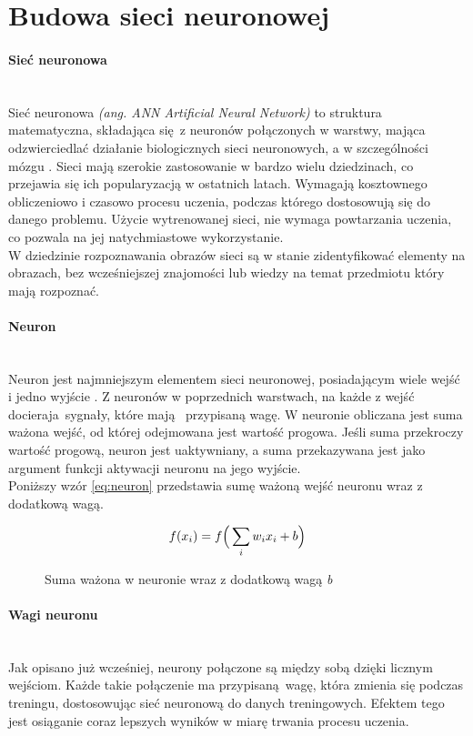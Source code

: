 \section{Budowa sieci neuronowej}
\paragraph{Sieć neuronowa} \mbox{}\\
Sieć neuronowa \textit{(ang. ANN Artificial Neural Network)} to struktura matematyczna,
składająca się z neuronów połączonych w warstwy, mająca odzwierciedlać działanie
biologicznych sieci neuronowych, a w szczególności mózgu \cite{intuitiveExplanation, WIKIcnn}.
Sieci mają szerokie zastosowanie w bardzo wielu dziedzinach, co przejawia się ich
popularyzacją w ostatnich latach. Wymagają kosztownego obliczeniowo i czasowo
procesu uczenia, podczas którego dostosowują się do danego problemu. Użycie wytrenowanej
sieci, nie wymaga powtarzania uczenia, co pozwala na jej natychmiastowe wykorzystanie.\\
W dziedzinie rozpoznawania obrazów sieci są w stanie zidentyfikować elementy na obrazach,
bez wcześniejszej znajomości lub wiedzy na temat przedmiotu który mają rozpoznać.

\paragraph{Neuron} \mbox{}\\
Neuron jest najmniejszym elementem sieci neuronowej, posiadającym wiele wejść i jedno wyjście \cite{CS231n_activ, NNbiology, NeuronAnimation}.
Z neuronów w poprzednich warstwach, na każde z wejść docieraja sygnały, które mają 
przypisaną wagę. W neuronie obliczana jest suma ważona wejść, od której odejmowana jest
wartość progowa. Jeśli suma przekroczy wartość progową, neuron jest uaktywniany, a suma
przekazywana jest jako argument funkcji aktywacji neuronu na jego wyjście.\\
Poniższy wzór \ref{eq:neuron} przedstawia sumę ważoną wejść neuronu wraz z dodatkową wagą.
\begin{figure}[h!]
\renewcommand{\figurename}{Wzór}%
\begin{equation} \label{eq:neuron}
f(x_{i}) = f\Big(\sum_{i}w_{i}x_{i} + b \Big)\\
\end{equation}
\caption{Suma ważona w neuronie wraz z dodatkową wagą \textit{b}}
\end{figure}

\paragraph{Wagi neuronu} \mbox{}\\
Jak opisano już wcześniej, neurony połączone są między sobą dzięki licznym wejściom.
Każde takie połączenie ma przypisaną wagę, która zmienia się podczas treningu,
dostosowując sieć neuronową do danych treningowych. Efektem tego jest osiąganie
coraz lepszych wyników w miarę trwania procesu uczenia.


